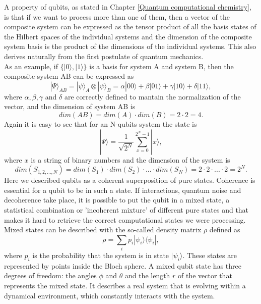 A property of qubits, as stated in Chapter \ref{Quantum computational chemistry}, is that if we want to process more than one of them, then a vector of the composite system can be expressed as the tensor product of all the basis states of the Hilbert spaces of the individual systems and the dimension of the composite system basis is the product of the dimensions of the individual systems. This also derives naturally from the first postulate of quantum mechanics. \\
As an example, if $\{ |0\rangle, |1\rangle \}$ is a basis for system A and system B, then the composite system AB can be expressed as
\begin{equation}
    |\Psi\rangle_{AB} = |\psi\rangle_A \otimes |\psi\rangle_B = \alpha |00\rangle + \beta |01\rangle + \gamma |10\rangle + \delta |11\rangle,
\end{equation}
where $\alpha, \beta, \gamma$ and $\delta$ are correctly defined to mantain the normalization of the vector, and the dimension of system AB is
\begin{equation}
    dim(AB) = dim(A) \cdot dim(B) = 2 \cdot 2 = 4.
\end{equation}
Again it is easy to see that for an N-qubits system the state is
\begin{equation}
    |\Psi\rangle = \frac{1}{\sqrt{2^N}} \sum_{x = 0}^{2^N - 1} |x\rangle,
\end{equation}
where $x$ is a string of binary numbers and the dimension of the system is
\begin{equation}
    dim(S_{1,2,...,N}) = dim(S_1) \cdot dim(S_2) \cdot ... \cdot dim(S_N) = 2 \cdot 2 \cdot ... \cdot 2 = 2^N.
\end{equation}
Here we described qubits as a coherent superposition of pure states. Coherence is essential for a qubit to be in such a state. If interactions, quantum noise and decoherence take place, it is possible to put the qubit in a mixed state, a statistical combination or 'incoherent mixture' of different pure states and that makes it hard to retrieve the correct computational states we were processing. Mixed states can be described with the so-called density matrix $\rho$ defined as
\begin{equation}
    \rho = \sum_i p_i |\psi_i\rangle \langle\psi_i|,
\end{equation}
where $p_i$ is the probability that the system is in state $|\psi_i\rangle$. These states are represented by points inside the Bloch sphere. A mixed qubit state has three degrees of freedom: the angles $\phi$ and $\theta$ and the length $r$ of the vector that represents the mixed state. It describes a real system that is evolving within a dynamical environment, which constantly interacts with the system. \\
